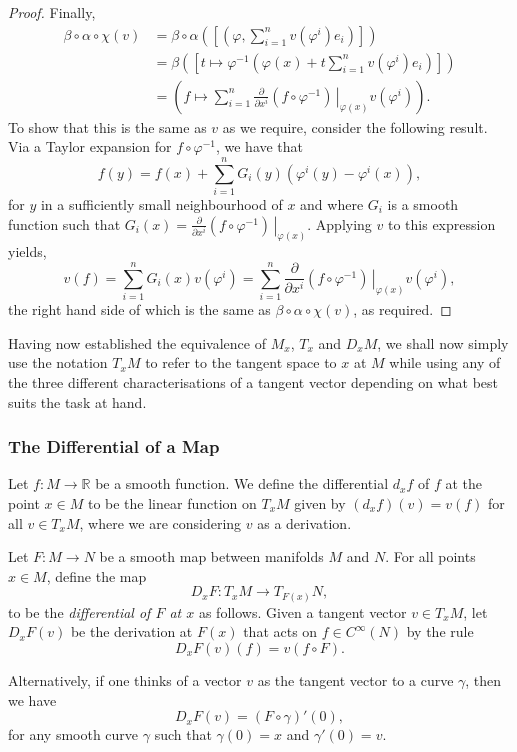 \documentclass[12pt,a4paper]{article}
\begin{document}
\begin{proof}
Finally,
\begin{align*}
\beta\circ\alpha\circ\chi(v)&=\beta\circ\alpha\left( \left[ \left( \varphi,\sum_{i=1}^{n}v(\varphi^i)e_i \right) \right] \right)\\
&=\beta\left( \left[ t\mapsto \varphi^{-1}\left( \varphi(x)+t\sum_{i=1}^nv(\varphi^i)e_i \right) \right] \right)\\
&=\left( f\mapsto\sum_{i=1}^n\frac{\partial}{\partial x^i}\left.(f\circ\varphi^{-1})\,\right\rvert_{\varphi(x)}v(\varphi^i) \right).
\end{align*}
To show that this is the same as $v$ as we require, consider the following result. Via a Taylor expansion for $f\circ\varphi^{-1}$, we have that
\[
f(y)=f(x)+\sum_{i=1}^nG_i(y)\left(\varphi^i(y)-\varphi^i(x)\right),
\]
for $y$ in a sufficiently small neighbourhood of $x$ and where $G_i$ is a smooth function such that $G_i(x)=\frac{\partial}{\partial x^i}\left. (f\circ\varphi^{-1})\,\right\rvert_{\varphi(x)}$. Applying $v$ to this expression yields,
\begin{equation}
v(f)=\sum_{i=1}^{n}G_i(x)v(\varphi^i)=\sum_{i=1}^n\frac{\partial}{\partial x^i}\left.(f\circ\varphi^{-1})\,\right\rvert_{\varphi(x)}v(\varphi^i),
\label{eq:vf-detail-1}
\end{equation}
the right hand side of which is the same as $\beta\circ\alpha\circ\chi(v)$, as required.
\end{proof}
Having now established the equivalence of $M_x$, $T_x$ and $D_xM$, we shall now simply use the notation $T_xM$ to refer to the tangent space to $x$ at $M$ while using any of the three different characterisations of a tangent vector depending on what best suits the task at hand.
\subsubsection{The Differential of a Map}
\begin{definition}
Let $f:M\to\mathbb{R}$ be a smooth function. We define the differential $d_xf$ of $f$ at the point $x\in M$ to be the linear function on $T_xM$ given by $(d_xf)(v)=v(f)$ for all $v\in T_xM$, where we are considering $v$ as a derivation. 

Let $F:M\to N$ be a smooth map between manifolds $M$ and $N$. For all points $x\in M$, define the map
\[
D_xF:T_xM\to T_{F(x)}N,
\]
to be the \textit{differential of $F$ at $x$} as follows. Given a tangent vector $v\in T_xM$, let $D_xF(v)$ be the derivation at $F(x)$ that acts on $f\in C^{\infty}(N)$ by the rule
\[
D_xF(v)(f)=v(f\circ F).
\]
\end{definition}
Alternatively, if one thinks of a vector $v$ as the tangent vector to a curve $\gamma$, then we have
\[
D_xF(v)=(F\circ\gamma)'(0),
\] 
for any smooth curve $\gamma$ such that $\gamma(0)=x$ and $\gamma'(0)=v$.
\end{document}
